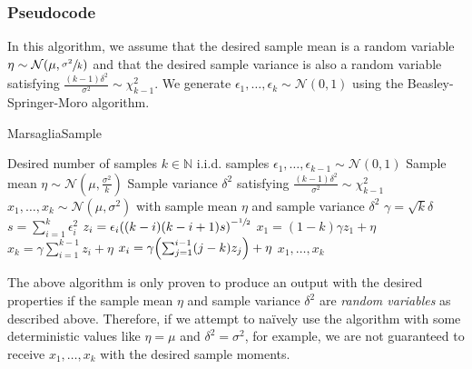 \documentclass[12pt, a4paper]{article}
\newcommand{\N}{\mathbb{N}}
\DeclarePairedDelimiter \set{\lbrace}{\rbrace}
\DeclarePairedDelimiter \parens{(}{)}
\begin{document}
        \subsubsection{Pseudocode} \label{sec:2.1.2}
        In this algorithm, we assume that the desired sample mean is a random variable $\eta \sim \mathcal{N}\parens*{\mu, \sfrac{\sigma^2}{k}}$
        and that the desired sample variance is also a random variable satisfying $\frac{(k - 1)\delta^2}{\sigma^2} \sim \chi_{k - 1}^2$.
        We generate $\epsilon_1, \dots, \epsilon_k \sim \mathcal{N}(0, 1)$ using the Beasley-Springer-Moro algorithm.
        \begin{algorithm}[H]
            \label{alg:marsaglia}
            \caption{\sc MarsagliaSample}
            \begin{algorithmic}
                 Desired number of samples $k \in \N$
                \STATE {~~~~~~~~~~} i.i.d. samples $\epsilon_1, \dots, \epsilon_{k - 1} \sim \mathcal{N}(0, 1)$
                \STATE {~~~~~~~~~~} Sample mean $\eta \sim \mathcal{N}(\mu, \frac{\sigma^2}{k})$
                \STATE {~~~~~~~~~~} Sample variance $\delta^2$ satisfying $\frac{(k - 1)\delta^2}{\sigma^2} \sim \chi_{k - 1}^2$
                 $x_1, \dots, x_k \sim \mathcal{N}(\mu, \sigma^2)$ with sample mean $\eta$ and sample variance $\delta^2$
                \STATE
                \STATE $\gamma = \sqrt{k}\delta$
                \STATE $s = \sum_{i = 1}^{k} \epsilon_i^2$
                    $z_i = \epsilon_i\parens*{(k - i)(k - i + 1)s}^{-\sfrac{1}{2}}$
                \ENDFOR
                \STATE $x_1 = (1 - k) \gamma z_1 + \eta$
                \STATE $x_k = \gamma\sum_{i = 1}^{k - 1}z_i + \eta$
                    $x_i = \gamma\parens*{\sum_{j = 1}^{i - 1}(j - k)z_j} + \eta$
                \ENDFOR
                \RETURN $x_1, \dots, x_k$
            \end{algorithmic}
        \end{algorithm}
        The above algorithm is only proven to produce an output with the desired properties if the
        sample mean $\eta$ and sample variance $\delta^2$ are {\it random variables} as described above. 
        Therefore, if we attempt to na\"ively use the algorithm with some deterministic values like $\eta = \mu$ and $\delta^2 = \sigma^2$, for example,
        we are not guaranteed to receive $x_1, \dots, x_k$ with the desired sample moments.
\end{document}
